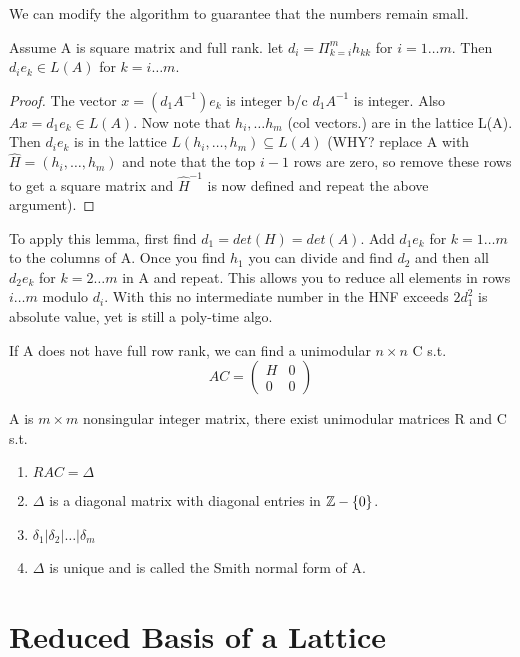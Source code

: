 We can modify the algorithm to guarantee that the numbers remain small. 


\begin{lemma}
Assume A is square matrix and full rank. let $d_i = \Pi_{k=i}^m h_{kk}$ for $i=1 \dots m$. Then  $d_ie_k \in L(A)$ for $k = i \dots m$.
\end{lemma}

\begin{proof}
The vector $x = (d_1A^{-1}) e_k$ is integer b/c $d_1A^{-1}$ is integer. Also $Ax = d_1e_k \in L(A)$. Now note that $h_i, \dots h_m$ (col vectors.) are in the lattice L(A). Then $d_ie_k$ is in the lattice $L(h_i, \dots, h_m) \subseteq L(A)$ (WHY? replace A with  $\hat H = (h_i, \dots, h_m)$ and note that the top $i-1$ rows are zero, so remove these rows to get a square matrix and $\hat H^{-1}$ is now defined and repeat the above argument).
\end{proof}


To apply this lemma, first find $d_1 = det(H) = det(A)$. Add $d_1e_k$ for $k=1\dots m$ to the columns of A. Once you find $h_1$ you can divide and find $d_2$ and then all $d_2e_k$ for $k=2\dots m$ in A and repeat. This allows you to reduce all elements in rows $i \dots m$ modulo $d_i$. With this no intermediate number in the HNF exceeds $2d_1^2$ is absolute value, yet is still a poly-time algo.

If A does not have full row rank, we can find a unimodular $n \times n$ C s.t.
\[ AC = \left( \begin{matrix} H & 0\\ 0 & 0 \end{matrix}\right) \]




\begin{definition}
A is $m \times m$ nonsingular integer matrix, there exist unimodular matrices R and C s.t.
\begin{enumerate}
	\item $RAC = \Delta$
	\item $\Delta$ is a diagonal matrix with diagonal entries in $\mathbb Z - \{0\}$.
	\item $\delta_1 | \delta_2 | \dots | \delta_m$
	\item $\Delta$ is unique and is called the Smith normal form of A.
\end{enumerate}
\end{definition}



\section{Reduced Basis of a Lattice}




